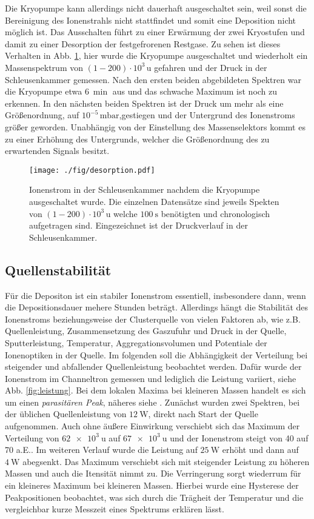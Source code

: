 Die Kryopumpe kann allerdings nicht dauerhaft ausgeschaltet sein, weil sonst die Bereinigung des Ionenstrahls nicht stattfindet und somit eine Deposition nicht möglich ist.
Das Ausschalten führt zu einer Erwärmung der zwei Kryostufen und damit zu einer Desorption der festgefrorenen Restgase.
Zu sehen ist dieses Verhalten in Abb. \ref{fig:desorp}, hier wurde die Kryopumpe ausgeschaltet und wiederholt ein Massenspektrum von $(1-200)\cdot 10^3\,\text{u}$ gefahren und der Druck in der Schleusenkammer gemessen.
Nach den ersten beiden abgebildeten Spektren war die Kryopumpe etwa $\SI{6}{\min}$ aus und das schwache Maximum ist noch zu erkennen.
In den nächsten beiden Spektren ist der Druck um mehr als eine Größenordnung, auf $10^{-5}\,\text{mbar}$,gestiegen und der Untergrund des Ionenstroms größer geworden.
Unabhängig von der Einstellung des Massenselektors kommt es zu einer Erhöhung des Untergrunds, welcher die Größenordnung des zu erwartenden Signals besitzt.
\begin{figure}
  \centering
  \texttt{[image: ./fig/desorption.pdf]}
  \caption{Ionenstrom in der Schleusenkammer nachdem die Kryopumpe ausgeschaltet wurde. Die einzelnen Datensätze sind jeweils Spekten von $(1-200)\cdot 10^3\,\text{u}$ welche $\SI{100}{\second}$ benötigten und chronologisch aufgetragen sind. Eingezeichnet ist der Druckverlauf in der Schleusenkammer.}
  \label{fig:desorp}
\end{figure}

\subsection{Quellenstabilität}
\label{sec:leistung}
Für die Depositon ist ein stabiler Ionenstrom essentiell, insbesondere dann, wenn die Depositionsdauer mehere Stunden beträgt.
Allerdings hängt die Stabilität des Ionenstroms beziehungsweise der Clusterquelle von vielen Faktoren ab, wie z.B. Quellenleistung, Zusammensetzung des Gaszufuhr und Druck in der Quelle, Sputterleistung, Temperatur, Aggregationsvolumen und Potentiale der Ionenoptiken in der Quelle.
Im folgenden soll die Abhängigkeit der Verteilung bei steigender und abfallender Quellenleistung beobachtet werden.
Dafür wurde der Ionenstrom im Channeltron gemessen und lediglich die Leistung variiert, siehe Abb. \ref{fig:leistung}.
Bei dem lokalen Maxima bei kleineren Massen handelt es sich um einen \textit{parasitären Peak}, näheres siehe \cite{gust}.
Zunächst wurden zwei Spektren, bei der üblichen Quellenleistung von $\SI{12}{\watt}$, direkt nach Start der Quelle aufgenommen. 
Auch ohne äußere Einwirkung verschiebt sich das Maximum der Verteilung von $\SI{62e3}{\amu}$ auf $\SI{67e3}{\amu}$ und der Ionenstrom steigt von 40 auf 70 a.E..
Im weiteren Verlauf wurde die Leistung auf $\SI{25}{\watt}$ erhöht und dann auf $\SI{4}{\watt}$ abegsenkt.
Das Maximum verschiebt sich mit steigender Leistung zu höheren Massen und auch die Itensität nimmt zu.
Die Verringerung sorgt wiederrum für ein kleineres Maximum bei kleineren Massen.
Hierbei wurde eine Hysterese der Peakpositionen beobachtet, was sich durch die Trägheit der Temperatur und die vergleichbar kurze Messzeit eines Spektrums erklären lässt.

